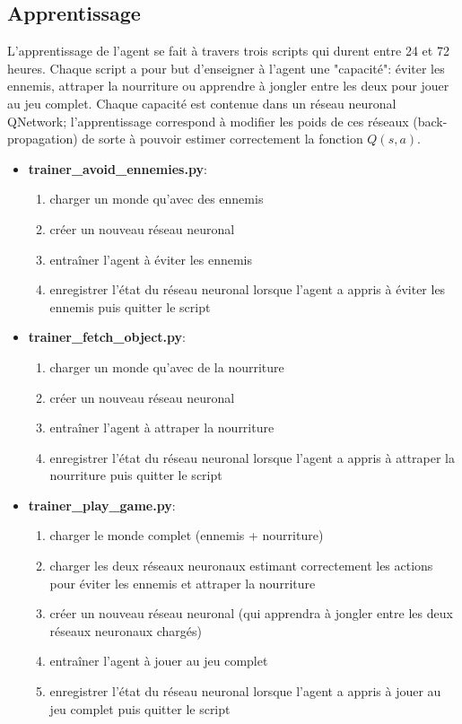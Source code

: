 \documentclass[11pt,a4paper]{report}
\begin{document}
  \subsection{Apprentissage}
    
  \par L'apprentissage de l'agent se fait à travers trois scripts qui durent entre 24 et 72 heures. Chaque script a pour but d'enseigner à l'agent une "capacité": éviter les ennemis, attraper la nourriture ou apprendre à jongler entre les deux pour jouer au jeu complet. Chaque capacité est contenue dans un réseau neuronal QNetwork; l'apprentissage correspond à modifier les poids de ces réseaux (back-propagation) de sorte à pouvoir estimer correctement la fonction $Q(s,a)$.

  \renewcommand{\labelitemi}{\textbullet}
  \begin{itemize}
  \item \textbf{trainer\_avoid\_ennemies.py}: 
      \begin{enumerate}
      \item charger un monde qu'avec des ennemis
      \item créer un nouveau réseau neuronal 
      \item entraîner l'agent à éviter les ennemis
      \item enregistrer l'état du réseau neuronal lorsque l'agent  a appris à éviter les ennemis puis quitter le script
      \end{enumerate}
  \item \textbf{trainer\_fetch\_object.py}: 
      \begin{enumerate}
      \item charger un monde qu'avec de la nourriture
      \item créer un nouveau réseau neuronal
      \item entraîner l'agent à attraper la nourriture
      \item enregistrer l'état du réseau neuronal lorsque l'agent  a appris à attraper la nourriture puis quitter le script
      \end{enumerate}  
  \item \textbf{trainer\_play\_game.py}:
      \begin{enumerate}
      \item charger le monde complet (ennemis + nourriture)
      \item charger les deux réseaux neuronaux estimant correctement les actions pour éviter les ennemis et attraper la nourriture
      \item créer un nouveau réseau neuronal (qui apprendra à jongler entre les deux réseaux neuronaux chargés)
      \item entraîner l'agent à jouer au jeu complet
      \item enregistrer l'état du réseau neuronal lorsque l'agent  a appris à jouer au jeu complet puis quitter le script
      \end{enumerate}
  \end{itemize}
  
\end{document}
